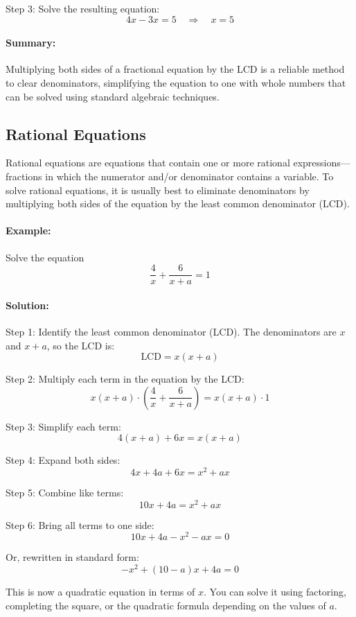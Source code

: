 \documentclass[11pt]{article}
\begin{document}
Step 3: Solve the resulting equation:
\[
4x - 3x = 5 \quad \Rightarrow \quad x = 5
\]

\paragraph{Summary:} Multiplying both sides of a fractional equation by the LCD is a reliable method to clear denominators, simplifying the equation to one with whole numbers that can be solved using standard algebraic techniques.

\subsection{Rational Equations}

Rational equations are equations that contain one or more rational expressions—fractions in which the numerator and/or denominator contains a variable. To solve rational equations, it is usually best to eliminate denominators by multiplying both sides of the equation by the least common denominator (LCD).

\paragraph{Example:} Solve the equation
\[
\frac{4}{x} + \frac{6}{x + a} = 1
\]

\paragraph{Solution:}

Step 1: Identify the least common denominator (LCD).
The denominators are \( x \) and \( x + a \), so the LCD is:
\[
\text{LCD} = x(x + a)
\]

Step 2: Multiply each term in the equation by the LCD:
\[
x(x + a) \cdot \left( \frac{4}{x} + \frac{6}{x + a} \right) = x(x + a) \cdot 1
\]

Step 3: Simplify each term:
\[
4(x + a) + 6x = x(x + a)
\]

Step 4: Expand both sides:
\[
4x + 4a + 6x = x^2 + ax
\]

Step 5: Combine like terms:
\[
10x + 4a = x^2 + ax
\]

Step 6: Bring all terms to one side:
\[
10x + 4a - x^2 - ax = 0
\]

Or, rewritten in standard form:
\[
-x^2 + (10 - a)x + 4a = 0
\]

This is now a quadratic equation in terms of \( x \). You can solve it using factoring, completing the square, or the quadratic formula depending on the values of \( a \).
\end{document}

